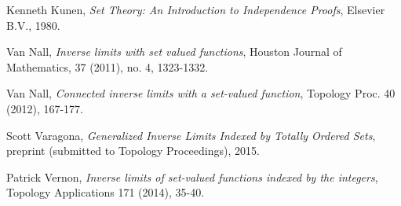 \documentclass{amsart}
\theoremstyle{definition}
\begin{document}
\begin{thebibliography}{10}
 Kenneth Kunen, {\it Set Theory: An Introduction to Independence Proofs}, Elsevier B.V., 1980.

\smallskip

 Van Nall, {\it Inverse limits with set valued functions}, Houston Journal of Mathematics, 37 (2011), no. 4, 1323-1332.

\smallskip

 Van Nall, {\it Connected inverse limits with a set-valued function}, Topology Proc. 40 (2012), 167-177.

\smallskip

 Scott Varagona, {\it Generalized Inverse Limits Indexed by Totally Ordered Sets}, preprint (submitted to Topology Proceedings), 2015.

\smallskip

 Patrick Vernon, {\it Inverse limits of set-valued functions indexed by the integers}, Topology Applications 171 (2014), 35-40.
\end{thebibliography}
\end{document}
